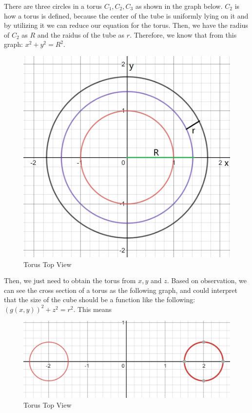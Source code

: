 \documentclass[a4paper,12pt]{report}
\begin{document}
There are three circles in a torus $C_1, C_2, C_3$ as shown in the graph below. $C_2$ is how a torus is defined, because the center of the tube is uniformly lying on it and by utilizing it we can reduce our equation for the torus.  Then, we have the radius of $C_2$ as $R$ and the raidus of the tube as $r$. Therefore, we know that from this graph:
\(x^2+y^2=R^2\).
\begin{figure}[h]
\centering
\includegraphics[scale=0.4]{./Pic/Torus2.png}
\caption{Torus Top View}
\end{figure}

Then, we just need to obtain the torus from $x,y$ and $z$. Based on observation, we can see the cross section of a torus as the following graph, and could interpret that the size of the cube should be a function like the following: $(g(x,y))^2+z^2=r^2$. This means 
\begin{figure}[h]
\centering
\includegraphics[scale=0.4]{./Pic/Torus3.png}
\caption{Torus Top View}
\end{figure}
\end{document}

